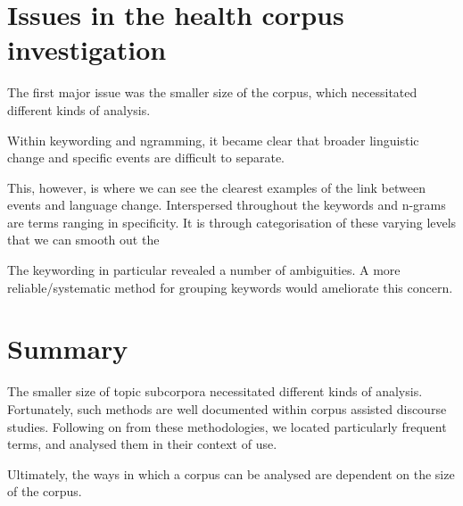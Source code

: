 \section{Issues in the health corpus investigation}

The first major issue was the smaller size of the corpus, which necessitated different kinds of analysis.

Within keywording and ngramming, it became clear that broader linguistic change and specific events are difficult to separate.

This, however, is where we can see the clearest examples of the link between events and language change. Interspersed throughout the keywords and n-grams are terms ranging in specificity. It is through categorisation of these varying levels that we can smooth out the 

The keywording in particular revealed a number of ambiguities. A more reliable\slash systematic method for grouping keywords would ameliorate this concern.

\section{Summary}

	The smaller size of topic subcorpora necessitated different kinds of analysis. Fortunately, such methods are well documented within corpus assisted discourse studies. Following on from these methodologies, we located particularly frequent terms, and analysed them in their context of use.


	Ultimately, the ways in which a corpus can be analysed are dependent on the size of the corpus. 



%
